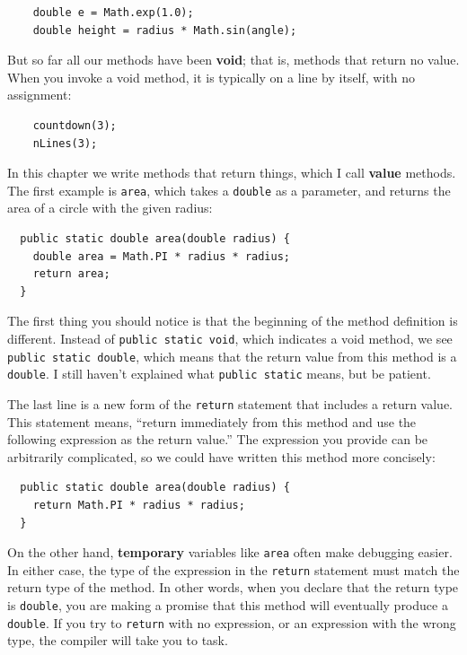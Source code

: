 \documentclass[12pt]{book}
\theoremstyle{exercise}
\begin{document}
\begin{lstlisting}
    double e = Math.exp(1.0);
    double height = radius * Math.sin(angle);
\end{lstlisting}
%
But so far all our methods have been {\bf void}; that is, methods
that return no value.  When you invoke a void method, it is typically
on a line by itself, with no assignment:

\begin{lstlisting}
    countdown(3);
    nLines(3);
\end{lstlisting}
%
In this chapter we write methods that return things, which I call
{\bf value} methods.  The first example is {\tt area}, which takes a
{\tt double} as a parameter, and returns the area of a circle with the
given radius:

\begin{lstlisting}
  public static double area(double radius) {
    double area = Math.PI * radius * radius;
    return area;
  }
\end{lstlisting}
%
The first thing you should notice is that the beginning of the
method definition is different.  Instead of {\tt public static
void}, which indicates a void method, we see {\tt public static
double}, which means that the return value from this method
is a {\tt double}.  I still haven't explained what
{\tt public static} means, but be patient.

The last line is a new form of the
{\tt return} statement that includes a return value.  This
statement means, ``return immediately from this method and
use the following expression as the return value.''  The
expression you provide can be arbitrarily complicated,
so we could have written this method more concisely:

\begin{lstlisting}
  public static double area(double radius) {
    return Math.PI * radius * radius;
  }
\end{lstlisting}
%
On the other hand, {\bf temporary} variables like {\tt area} often
make debugging easier.  In either case, the type of the expression in
the {\tt return} statement must match the return type of the method.
In other words, when you declare that the return type is {\tt double},
you are making a promise that this method will eventually
produce a {\tt double}.  If you try to {\tt return} with no
expression, or an expression with the wrong type, the compiler will
take you to task.

\end{document}
